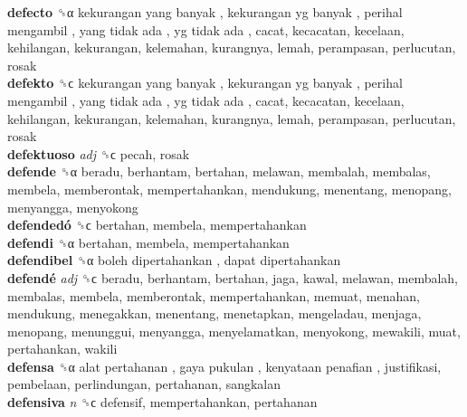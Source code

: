 \textbf{defecto} ␝α   kekurangan yang banyak ,  kekurangan yg banyak ,  perihal mengambil ,  yang tidak ada ,  yg tidak ada , cacat, kecacatan, kecelaan, kehilangan, kekurangan, kelemahan, kurangnya, lemah, perampasan, perlucutan, rosak  \\
\textbf{defekto} ␝ϲ   kekurangan yang banyak ,  kekurangan yg banyak ,  perihal mengambil ,  yang tidak ada ,  yg tidak ada , cacat, kecacatan, kecelaan, kehilangan, kekurangan, kelemahan, kurangnya, lemah, perampasan, perlucutan, rosak  \\
\textbf{defektuoso} \emph{adj}  ␝ϲ  pecah, rosak  \\
\textbf{defende} ␝α  beradu, berhantam, bertahan, melawan, membalah, membalas, membela, memberontak, mempertahankan, mendukung, menentang, menopang, menyangga, menyokong  \\
\textbf{defendedó} ␝ϲ  bertahan, membela, mempertahankan  \\
\textbf{defendi} ␝α  bertahan, membela, mempertahankan  \\
\textbf{defendibel} ␝α   boleh dipertahankan ,  dapat dipertahankan   \\
\textbf{defendé} \emph{adj}  ␝ϲ  beradu, berhantam, bertahan, jaga, kawal, melawan, membalah, membalas, membela, memberontak, mempertahankan, memuat, menahan, mendukung, menegakkan, menentang, menetapkan, mengeladau, menjaga, menopang, menunggui, menyangga, menyelamatkan, menyokong, mewakili, muat, pertahankan, wakili  \\
\textbf{defensa} ␝α   alat pertahanan ,  gaya pukulan ,  kenyataan penafian , justifikasi, pembelaan, perlindungan, pertahanan, sangkalan  \\
\textbf{defensiva} \emph{n}  ␝ϲ  defensif, mempertahankan, pertahanan  \\
